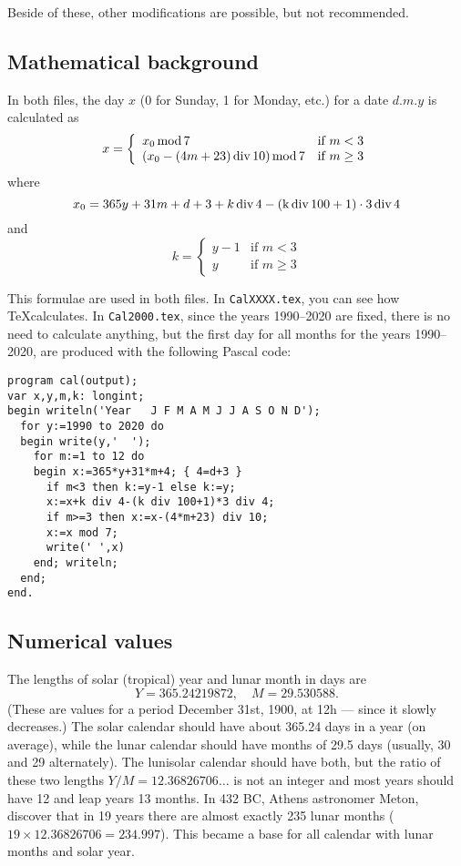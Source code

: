 \documentclass{article}
\renewcommand{\div}{\rm\,div\,}\newcommand{\mod}{\rm\,mod\,}
\begin{document}
Beside of these, other modifications are possible, but not recommended.

\subsection*{Mathematical background}

In both files, the day $x$ (0 for Sunday, 1 for Monday, etc.) for a date $d.m.y$ is calculated as
\[ x=\left\{\begin{array}{ll}
         x_0 \mod 7 & \mbox{if $m<3$} \\ (x_0-(4m+23) \div 10) \mod 7 & \mbox{if $m\ge3$}
     \end{array}\right. \]
where
\[x_0=365y+31m+d+3+k \div 4-(k \div 100+1)\cdot3 \div 4\]
and
\[ k=\left\{\begin{array}{ll} y-1 & \mbox{if $m<3$}\\ y & \mbox{if $m\ge3$} \end{array}\right.\]

This formulae are used in both files. In \verb|CalXXXX.tex|, you can see how \TeX calculates. In
\verb|Cal2000.tex|, since the years 1990--2020 are fixed, there is no need to calculate anything,
but the first day for all months for the years 1990--2020, are produced with the following Pascal
code:

\begin{verbatim}
program cal(output);
var x,y,m,k: longint;
begin writeln('Year   J F M A M J J A S O N D');
  for y:=1990 to 2020 do
  begin write(y,'  ');
    for m:=1 to 12 do
    begin x:=365*y+31*m+4; { 4=d+3 }
      if m<3 then k:=y-1 else k:=y;
      x:=x+k div 4-(k div 100+1)*3 div 4;
      if m>=3 then x:=x-(4*m+23) div 10;
      x:=x mod 7;
      write(' ',x)
    end; writeln;
  end;
end.
\end{verbatim}

\subsection*{Numerical values}

The lengths of solar (tropical) year and lunar month in days are
\[ Y=365.24219872,\quad M=29.530588. \]
(These are values for a period December 31st, 1900, at 12h --- since it slowly decreases.) The
solar calendar should have about 365.24 days in a year (on average), while the lunar calendar
should have months of 29.5 days (usually, 30 and 29 alternately). The lunisolar calendar should
have both, but the ratio of these two lengths $Y/M=12.36826706\ldots$ is not an integer and most
years should have 12 and leap years 13 months. In 432 BC, Athens astronomer Meton, discover that in
19 years there are almost exactly 235 lunar months ($19\times 12.36826706=234.997$). This became a
base for all calendar with lunar months and solar year.
\end{document}
